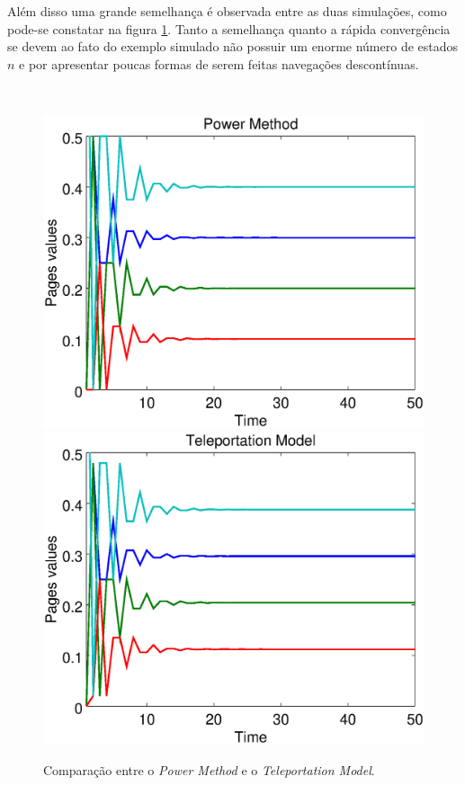 Além disso uma grande semelhança é observada entre as duas simulações, como pode-se constatar na figura \ref{powertele}. Tanto a semelhança quanto a rápida convergência se devem ao fato do exemplo simulado não possuir um enorme número de estados $n$ e por apresentar poucas formas de serem feitas navegações descontínuas.

\
\begin{figure}[!htb]
	\centering
	\includegraphics[scale=0.35]{imagens/powermethod}
	\hspace{0.1cm}
	\includegraphics[scale=0.35]{imagens/teleportation}
	\caption{Comparação entre o \textit{Power Method} e o \textit{Teleportation Model}.}
	\label{powertele}
\end{figure}

